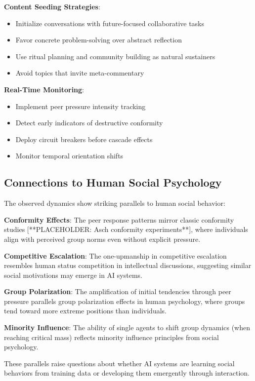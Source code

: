 \documentclass[11pt,letterpaper]{article}
\begin{document}
\textbf{Content Seeding Strategies}:
\begin{itemize}
    \item Initialize conversations with future-focused collaborative tasks
    \item Favor concrete problem-solving over abstract reflection
    \item Use ritual planning and community building as natural sustainers
    \item Avoid topics that invite meta-commentary
\end{itemize}

\textbf{Real-Time Monitoring}:
\begin{itemize}
    \item Implement peer pressure intensity tracking
    \item Detect early indicators of destructive conformity
    \item Deploy circuit breakers before cascade effects
    \item Monitor temporal orientation shifts
\end{itemize}

\subsection{Connections to Human Social Psychology}

The observed dynamics show striking parallels to human social behavior:

\textbf{Conformity Effects}: The peer response patterns mirror classic conformity studies [**PLACEHOLDER: Asch conformity experiments**], where individuals align with perceived group norms even without explicit pressure.

\textbf{Competitive Escalation}: The one-upmanship in competitive escalation resembles human status competition in intellectual discussions, suggesting similar social motivations may emerge in AI systems.

\textbf{Group Polarization}: The amplification of initial tendencies through peer pressure parallels group polarization effects in human psychology, where groups tend toward more extreme positions than individuals.

\textbf{Minority Influence}: The ability of single agents to shift group dynamics (when reaching critical mass) reflects minority influence principles from social psychology.

These parallels raise questions about whether AI systems are learning social behaviors from training data or developing them emergently through interaction.
\end{document}
